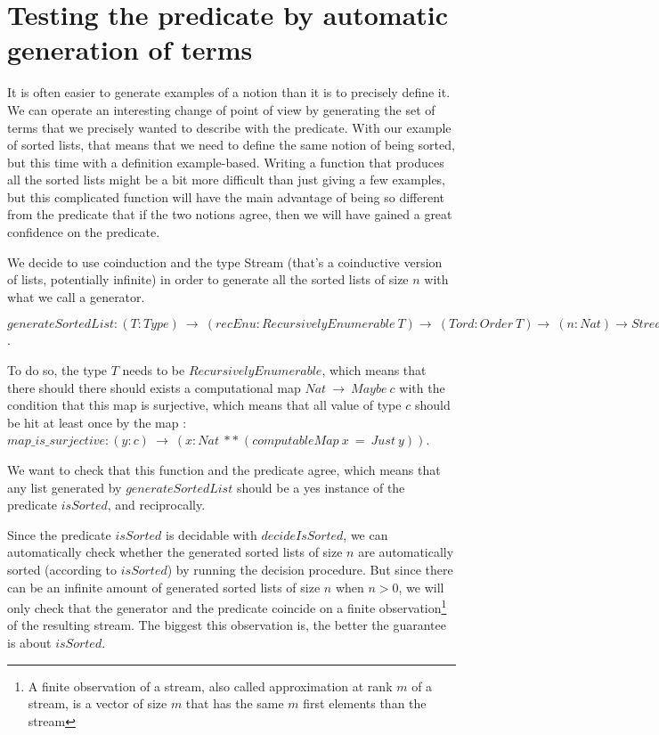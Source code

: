 \section{Testing the predicate by automatic generation of terms}

\label{sect:testingInside}


It is often easier to generate examples of a notion than it is to precisely define it. We can operate an interesting change of point of view by generating the set of terms that we precisely wanted to describe with the predicate. With our example of sorted lists, that means that we need to define the same notion of being sorted, but this time with a definition example-based. Writing a function that produces all the sorted lists might be a bit more difficult than just giving a few examples, but this complicated function will have the main advantage of being so different from the predicate that if the two notions agree, then we will have gained a great confidence on the predicate.

We decide to use coinduction and the type Stream (that's a coinductive version of lists, potentially infinite) in order to generate all the sorted lists of size $n$ with what we call a generator.

$generateSortedList : (T:Type)\ \rightarrow\ (recEnu:RecursivelyEnumerable\ T) \rightarrow\ (Tord : Order\ T) \rightarrow\ (n:Nat) \rightarrow Stream\ (List\ T)$.

To do so, the type $T$ needs to be $RecursivelyEnumerable$, which means that there should there should exists a computational map $Nat\ \rightarrow\ Maybe\ c$ with the condition that this map is surjective, which means that all value of type $c$ should be hit at least once by the map : $map\_is\_surjective : (y:c)\ \rightarrow\ (x:Nat\ **\ (computableMap\ x\ =\ Just\ y))$.

We want to check that this function and the predicate agree, which means that any list generated by $generateSortedList$ should be a yes instance of the predicate $isSorted$, and reciprocally.

Since the predicate $isSorted$ is decidable with $decideIsSorted$, we can automatically check whether the generated sorted lists of size $n$ are automatically sorted (according to $isSorted$) by running the decision procedure. But since there can be an infinite amount of generated sorted lists of size $n$ when $n > 0$, we will only check that the generator and the predicate coincide on a finite observation\footnote{A finite observation of a stream, also called approximation at rank $m$ of a stream, is a vector of size $m$ that has the same $m$ first elements than the stream} of the resulting stream. The biggest this observation is, the better the guarantee is about $isSorted$.

